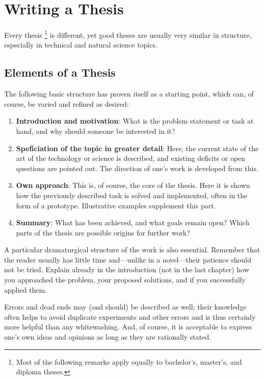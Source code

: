 \chapter{Writing a Thesis}
\label{cha:TheThesis}

Every thesis%
\footnote{Most of the following remarks apply equally to bachelor's, master's,
and diploma theses.}
is different, yet good theses are usually very similar in structure, especially
in technical and natural science topics.

\section{Elements of a Thesis}

The following basic structure has proven itself as a starting point, which can,
of course, be varied and refined as desired:
%
\begin{enumerate}
	\item \textbf{Introduction and motivation}: What is the problem statement or
	task at hand, and why should someone be interested in it?
	\item \textbf{Speficiation of the topic in greater detail}: Here, the
	current state of the art of the technology or science is described, and
	existing deficits or open questions are pointed out. The direction of one's
	work is developed from this.
	\item \textbf{Own approach}: This is, of course, the core of the thesis.
	Here it is shown how the previously described task is solved and
	implemented, often in the form of a prototype. Illustrative examples
	supplement this part.
	\item \textbf{Summary}: What has been achieved, and what goals remain open?
	Which parts of the thesis are possible origins for further work?
\end{enumerate}
%
A particular dramaturgical structure of the work is also essential. Remember
that the reader usually has little time and---unlike in a novel---their
patience should not be tried. Explain already in the introduction (not in the
last chapter) how you approached the problem, your proposed solutions, and if
you successfully applied them.

Errors and dead ends may (and should) be described as well; their knowledge
often helps to avoid duplicate experiments and other errors and is thus
certainly more helpful than any whitewashing. And, of course, it is acceptable
to express one's own ideas and opinions as long as they are rationally stated.


